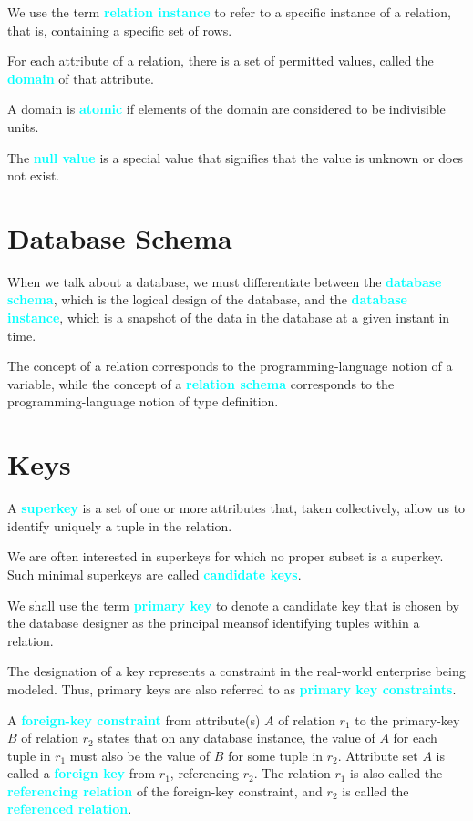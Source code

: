 \documentclass[a4paper,12pt,twoside,openany]{book}
\newcommand{\textcy}[1]{\textbf{\textcolor{cyan}{#1}}}
\begin{document}
We use the term \textcy{relation instance} to refer to a specific instance of a relation, that is, containing a specific set of rows.

For each attribute of a relation, there is a set of permitted values, called the \textcy{domain} of that attribute.

A domain is \textcy{atomic} if elements of the domain are considered to be indivisible units.

The \textcy{null value} is a special value that signifies that the value is unknown or does not exist.

\section{Database Schema}

When we talk about a database, we must differentiate between the \textcy{database schema}, which is the logical design of the database, and the \textcy{database instance}, which is a snapshot of the data in the database at a given instant in time.

The concept of a relation corresponds to the programming-language notion of a variable, while the concept of a \textcy{relation schema} corresponds to the programming-language notion of type definition.

\section{Keys}

A \textcy{superkey} is a set of one or more attributes that, taken collectively, allow us to identify uniquely a tuple in the relation.

We are often interested in superkeys for which no proper subset is a superkey. Such minimal superkeys are called \textcy{candidate keys}.

We shall use the term \textcy{primary key} to denote a candidate key that is chosen by the database designer as the principal meansof identifying tuples within a relation.

The designation of a key represents a constraint in the real-world enterprise being modeled. Thus, primary keys are also referred to as \textcy{primary key constraints}.

A \textcy{foreign-key constraint} from attribute(s) $A$ of relation $r_1$ to the primary-key $B$ of relation $r_2$ states that on any database instance, the value of $A$ for each tuple in $r_1$ must also be the value of $B$ for some tuple in $r_2$. Attribute set $A$ is called a \textcy{foreign key} from $r_1$, referencing $r_2$. The relation $r_1$ is also called the \textcy{referencing relation} of the foreign-key constraint, and $r_2$ is called the \textcy{referenced relation}.
\end{document}
